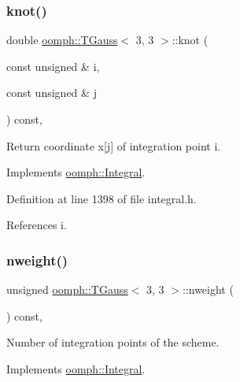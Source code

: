 \subsubsection{\texorpdfstring{knot()}{knot()}}
{\footnotesize\ttfamily double \hyperlink{classoomph_1_1TGauss}{oomph\+::\+T\+Gauss}$<$ 3, 3 $>$\+::knot (\begin{DoxyParamCaption}\item[{const unsigned \&}]{i,  }\item[{const unsigned \&}]{j }\end{DoxyParamCaption}) const\hspace{0.3cm}{\ttfamily [inline]}, {\ttfamily [virtual]}}



Return coordinate x\mbox{[}j\mbox{]} of integration point i. 



Implements \hyperlink{classoomph_1_1Integral_a1a2122f99a87c18649bafdd9ed739758}{oomph\+::\+Integral}.



Definition at line 1398 of file integral.\+h.



References i.

\mbox{\label{classoomph_1_1TGauss_3_013_00_013_01_4_a9d4caa0849902955e93cc0ce926206bf}} 
\subsubsection{\texorpdfstring{nweight()}{nweight()}}
{\footnotesize\ttfamily unsigned \hyperlink{classoomph_1_1TGauss}{oomph\+::\+T\+Gauss}$<$ 3, 3 $>$\+::nweight (\begin{DoxyParamCaption}{ }\end{DoxyParamCaption}) const\hspace{0.3cm}{\ttfamily [inline]}, {\ttfamily [virtual]}}



Number of integration points of the scheme. 



Implements \hyperlink{classoomph_1_1Integral_a1a270de9d99a1fcf1d25a6c1017f65fa}{oomph\+::\+Integral}.



